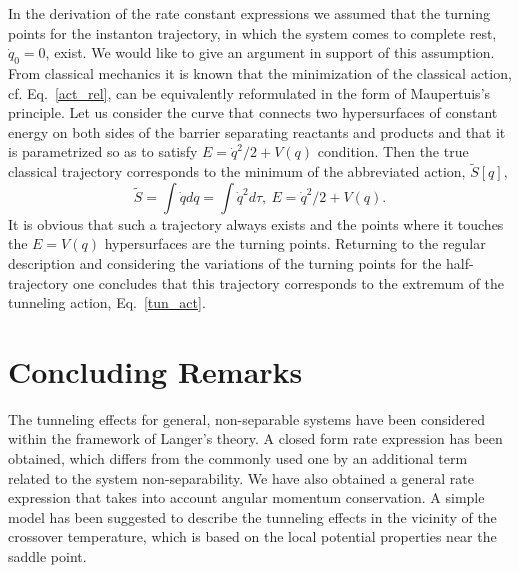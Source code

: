 \documentclass[journal=jpcafh,manuscript=article]{achemso}
\begin{document}
In the derivation of the rate constant expressions we assumed that the
turning points for the instanton trajectory, in which the system comes
to complete rest, $\dot{q}_0=0$, exist. We would like to give an
argument in support of this assumption.  From classical mechanics
it is known that the minimization of the classical action,
cf. Eq.~\ref{act_rel}, can be equivalently reformulated in the form of
Maupertuis's principle.\cite{arnold78} Let us consider the curve that
connects two hypersurfaces of constant energy on both sides of the
barrier separating reactants and products and that it is parametrized so as
to satisfy $E= \dot{q}^2/2 + V(q)$ condition. Then the true classical
trajectory corresponds to the minimum of the abbreviated action,
$\tilde{S}[q]$,
\begin{equation}
  \label{maup}
  \tilde{S}=\int \dot{q}dq = \int \dot{q}^2 d\tau,\ E=\dot{q}^2/2+V(q).
\end{equation}
It is obvious that such a trajectory always exists and the points
where it touches the $E=V(q)$ hypersurfaces are the turning
points. Returning to the regular description and considering the
variations of the turning points for the half-trajectory one concludes
that this trajectory corresponds to the extremum of the tunneling
action, Eq.~\ref{tun_act}.

\section{Concluding Remarks}

The tunneling effects for general, non-separable systems have been
considered within the framework of Langer's theory. A closed form rate
expression has been obtained, which differs from the commonly used one
by an additional term related to the system non-separability. We have
also obtained a general rate expression that takes into account
angular momentum conservation. A simple model has been suggested to
describe the tunneling effects in the vicinity of the crossover
temperature, which is based on the local potential properties near the
saddle point.

\newpage
{}

\renewcommand{\thesection}{\Alph{section}.}
\renewcommand{\theequation}{\Alph{section}.\arabic{equation}}

\setcounter{equation}{0}
\end{document}

